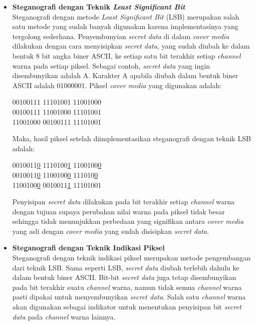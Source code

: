 \documentclass[a4paper,twoside]{article}
\begin{document}
\begin{enumerate}
\begin{itemize}
		\item \textbf{Steganografi dengan Teknik \textit{Least Significant Bit}}\\
		Steganografi dengan metode \textit{Least Significant Bit} (LSB) merupakan salah satu metode yang sudah banyak digunakan karena implementasinya yang tergolong sederhana. Penyembunyian \textit{secret data} di dalam \textit{cover media} dilakukan dengan cara menyisipkan \textit{secret data}, yang sudah diubah ke dalam bentuk 8 bit angka biner ASCII, ke setiap satu bit terakhir setiap \textit{channel} warna pada setiap piksel. Sebagai contoh, \textit{secret data} yang ingin disembunyikan adalah A. Karakter A apabila diubah dalam bentuk biner ASCII adalah 01000001. Piksel \textit{cover media} yang digunakan adalah:
		
		\begin{center}
		00100111 11101001 11001000\\
		00100111 11001000 11101001\\
		11001000 00100111 11101001
		\end{center}
		
		Maka, hasil piksel setelah diimplementasikan steganografi dengan teknik LSB adalah:
		
		\begin{center}
		0010011\underline{0} 1110100\underline{1} 1100100\underline{0}\\
		0010011\underline{0} 1100100\underline{0} 111010\underline{0}\\
		1100100\underline{0} 0010011\underline{1} 11101001
		\end{center}
		
		Penyisipan \textit{secret data} dilakukan pada bit terakhir setiap \textit{channel} warna dengan tujuan supaya perubahan nilai warna pada piksel tidak besar sehingga tidak menunjukkan perbedaan yang signifikan antara \textit{cover media} yang asli dengan \textit{cover media} yang sudah disisipkan \textit{secret data}.\\
		
		\item \textbf{Steganografi dengan Teknik Indikasi Piksel}\\
		Steganografi dengan teknik indikasi piksel merupakan metode pengembangan dari teknik LSB. Sama seperti LSB, \textit{secret data} diubah terlebih dahulu ke dalam bentuk biner ASCII. Bit-bit \textit{secret data} juga tetap disembunyikan pada bit terakhir suatu \textit{channel} warna, namun tidak semua \textit{channel} warna pasti dipakai untuk menyembunyikan \textit{secret data}. Salah satu \textit{channel} warna akan digunakan sebagai indikator untuk menentukan penyisipan bit \textit{secret data} pada \textit{channel} warna lainnya.\\
		

\end{itemize}
\end{enumerate}
\end{document}
